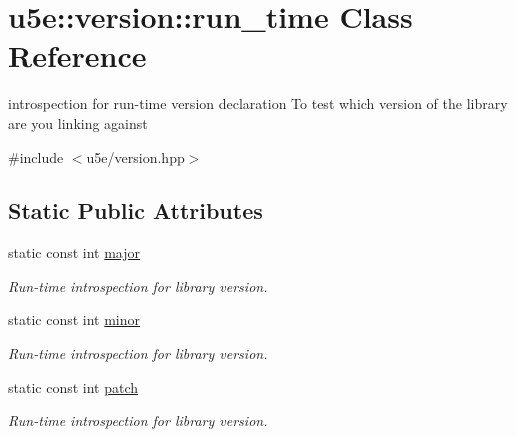 \hypertarget{classu5e_1_1version_1_1run__time}{}\section{u5e\+:\+:version\+:\+:run\+\_\+time Class Reference}
\label{classu5e_1_1version_1_1run__time}


introspection for run-\/time version declaration To test which version of the library are you linking against  




{\ttfamily \#include $<$u5e/version.\+hpp$>$}

\subsection*{Static Public Attributes}
{\bf }\par
\begin{DoxyCompactItemize}
\item 
static const int \hyperlink{classu5e_1_1version_1_1run__time_af9ae22e12e9f02e28d5e6969a038f1f5}{major}\hypertarget{classu5e_1_1version_1_1run__time_af9ae22e12e9f02e28d5e6969a038f1f5}{}\label{classu5e_1_1version_1_1run__time_af9ae22e12e9f02e28d5e6969a038f1f5}

\begin{DoxyCompactList}\small\item\em Run-\/time introspection for library version. \end{DoxyCompactList}\item 
static const int \hyperlink{classu5e_1_1version_1_1run__time_a2a7f0813841d742afe86ad0899fbd046}{minor}\hypertarget{classu5e_1_1version_1_1run__time_a2a7f0813841d742afe86ad0899fbd046}{}\label{classu5e_1_1version_1_1run__time_a2a7f0813841d742afe86ad0899fbd046}

\begin{DoxyCompactList}\small\item\em Run-\/time introspection for library version. \end{DoxyCompactList}\item 
static const int \hyperlink{classu5e_1_1version_1_1run__time_ab97c8f0bff8d8dbdf901693135f2411f}{patch}\hypertarget{classu5e_1_1version_1_1run__time_ab97c8f0bff8d8dbdf901693135f2411f}{}\label{classu5e_1_1version_1_1run__time_ab97c8f0bff8d8dbdf901693135f2411f}

\begin{DoxyCompactList}\small\item\em Run-\/time introspection for library version. \end{DoxyCompactList}\end{DoxyCompactItemize}




